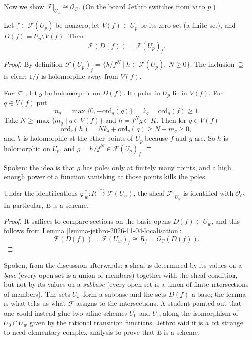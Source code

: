 Now we show $\mathcal{F}|_{U_w}\cong
\mathcal{O}_C$. (On the board Jethro switches
from $w$ to $p$.)

\begin{lemma}
\label{lemma-jethro-2026-11-04-localisation}
Let $f\in\mathcal{F}(U_p)$ be nonzero, let
$V(f)\subset U_p$ be its zero set (a finite
set), and $D(f)=U_p\setminus V(f)$. Then
$$
\mathcal{F}(D(f))=\mathcal{F}(U_p)_f.
$$
\end{lemma}

\begin{proof}
By definition $\mathcal{F}(U_p)_f=\{h/f^N\mid
h\in\mathcal{F}(U_p),\ N\geq 0\}$. The
inclusion $\supseteq$ is clear: $1/f$ is
holomorphic away from $V(f)$.

For $\subseteq$, let $g$ be holomorphic on
$D(f)$. Its poles in $U_p$ lie in $V(f)$. For
$q\in V(f)$ put
$$
m_q=\max\{0,-\mathrm{ord}_q(g)\},\quad
k_q=\mathrm{ord}_q(f)\geq 1.
$$
Take $N\geq\max\{m_q\mid q\in V(f)\}$ and
$h=f^Ng\in K$. Then for $q\in V(f)$
$$
\mathrm{ord}_q(h)=Nk_q+\mathrm{ord}_q(g)
\geq N-m_q\geq 0,
$$
and $h$ is holomorphic at the other points of
$U_p$ because $f$ and $g$ are. So $h$ is
holomorphic on $U_p$, and
$g=h/f^N\in\mathcal{F}(U_p)_f$.
\end{proof}

Spoken: the idea is that $g$ has poles only
at finitely many points, and a high enough
power of a function vanishing at those points
kills the poles.

\begin{proposition}
\label{proposition-jethro-2026-11-04-scheme}
Under the identifications $\varphi_w^*\colon
R\xrightarrow{\sim} \mathcal{F}(U_w)$, the
sheaf $\mathcal{F}|_{U_w}$ is identified with
$\mathcal{O}_C$. In particular, $E$ is a
scheme.
\end{proposition}

\begin{proof}
It suffices to compare sections on the basic
opens $D(f)\subset U_w$, and this follows
from Lemma
\ref{lemma-jethro-2026-11-04-localisation}:
$$
\mathcal{F}(D(f))=\mathcal{F}(U_w)_f
\cong R_f=\mathcal{O}_C(D(f)).
$$
\end{proof}

Spoken, from the discussion afterwards: a
sheaf is determined by its values on a
\textit{base} (every open set is a union of
members) together with the sheaf condition,
but not by its values on a \textit{subbase}
(every open set is a union of finite
intersections of members). The sets $U_w$
form a subbase and the sets $D(f)$ a base;
the lemma is what tells us what $\mathcal{F}$
assigns to the intersections. A student
pointed out that one could instead glue two
affine schemes $U_0$ and $U_w$ along the
isomorphism of $U_0\cap U_w$ given by the
rational transition functions. Jethro said it
is a bit strange to need elementary complex
analysis to prove that $E$ is a scheme.


